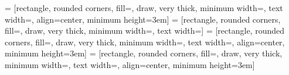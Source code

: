  = [rectangle, rounded corners, fill=\fxcolor, draw, very thick, minimum width=\nnboxminwidth, text width=\nnboxtextwidth, align=center, minimum height=3em]
 = [rectangle, rounded corners, fill=\combocolor, draw, very thick, minimum width=\nnboxminwidth, text width=\nnboxtextwidth]
 = [rectangle, rounded corners, fill=\glasgowcolor, draw, very thick, minimum width=\nnboxminwidth, text width=\nnboxtextwidth, align=center, minimum height=3em]
 = [rectangle, rounded corners, fill=\resnetcolor, draw, very thick, minimum width=\nnboxminwidth, text width=\nnboxtextwidth, align=center, minimum height=3em]


% 
% 




